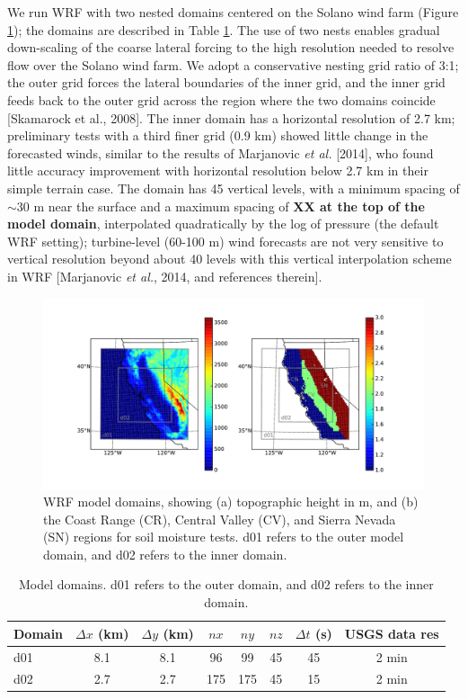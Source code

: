 We run WRF with two nested domains centered on the Solano wind farm (Figure \ref{fig:windSol_domainmap}); the domains are described in Table \ref{table:windSol_domains}.  The use of two nests enables gradual down-scaling of the coarse lateral forcing to the high resolution needed to resolve flow over the Solano wind farm.  We adopt a conservative nesting grid ratio of 3:1; the outer grid forces the lateral boundaries of the inner grid, and the inner grid feeds back to the outer grid across the region where the two domains coincide [Skamarock et al., 2008].  The inner domain has a horizontal resolution of 2.7 km; preliminary tests with a third finer grid (0.9 km) showed little change in the forecasted winds, similar to the results of Marjanovic \textit{et al.} [2014], who found little accuracy improvement with horizontal resolution below 2.7 km in their simple terrain case.  The domain has 45 vertical levels, with a minimum spacing of $\sim$30 m near the surface and a maximum spacing of \textbf{XX at the top of the model domain}, interpolated quadratically by the log of pressure (the default WRF setting); turbine-level (60-100 m) wind forecasts are not very sensitive to vertical resolution beyond about 40 levels with this vertical interpolation scheme in WRF [Marjanovic \textit{et al.}, 2014, and references therein].

\begin{figure}[here]
\includegraphics[width=1\textwidth]{ch3-wind/img/domain_map.pdf}
\caption{WRF model domains, showing (a) topographic height in m, and (b) the Coast Range (CR), Central Valley (CV), and Sierra Nevada (SN) regions for soil moisture tests. d01 refers to the outer model domain, and d02 refers to the inner domain.}
\label{fig:windSol_domainmap}
\end{figure}

\begin{table}
\begin{tabular}{ l c c c c c c c }
\hline
Domain & $\Delta x$ (km) & $\Delta y$ (km) & $nx$ & $ny$ & $nz$ & $\Delta t$ (s) & USGS data res \\ \hline
d01 & 8.1 & 8.1 & 96 & 99 & 45 & 45 & 2 min\\
d02 & 2.7 & 2.7 & 175 & 175 & 45 & 15 & 2 min\\
\hline
\end{tabular}
\caption{Model domains. d01 refers to the outer domain, and d02 refers to the inner domain.}
\label{table:windSol_domains}
\end{table}

